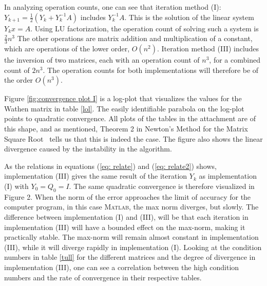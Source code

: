 In analyzing operation counts, one can see that iteration method (I): $Y_{k+1}=\frac{1}{2}(Y_{k}+Y_{k}^{-1}A)$ includes $Y_{k}^{-1}A$. This is the solution of the linear system $Y_{k}x=A$. Using LU factorization, the operation count of solving such a system is $\frac{2}{3}n^{3}$ The other operations are matrix addition and multiplication of a constant, which are operations of the lower order, $O(n^{2})$. Iteration method (III) includes the inversion of two matrices, each with an operation count of $n^{3}$, for a combined count of $2n^{3}$. The operation counts for both implementations will therefore be of the order $O(n^3)$.

Figure \ref{fig:convergence plot I} is a log-plot that visualizes the values for the Wathen matrix in table \ref{lol}. The easily identifiable parabola on the log-plot points to quadratic convergence. All plots of the tables in the attachment are of this shape, and as mentioned, Theorem 2 in Newton's Method for the Matrix Square Root~\cite{paper} tells us that this is indeed the case. The figure also shows the linear divergence caused by the instability in the algorithm. 

As the relations in equations (\ref{eq: relate}) and (\ref{eq: relate2})  shows, implementation (III) gives the same result of the iteration  $Y_k$ as implementation (I) with $Y_{0}=Q_{0}=I$. The same quadratic convergence is therefore visualized in Figure 2. When the norm of the error approaches the limit of accuracy for the computer program, in this case \textsc{Matlab}, the max norm diverges, but slowly. The difference between implementation (I) and (III), will be that each iteration in implementation (III) will have a bounded effect on the max-norm, making it practically stable. The max-norm will remain almost constant in implementation (III), while it will diverge rapidly in implementation (I). Looking at the condition numbers in table \ref{tull} for the different matrices and the degree of divergence in implementation (III), one can see a correlation between the high condition numbers and the rate of convergence in their respective tables.



